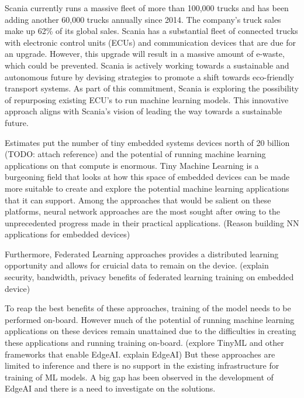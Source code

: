 Scania currently runs a massive fleet of more than 100,000 trucks and has been adding another 60,000 trucks annually since 2014. The company's truck sales make up 62\% of its global sales. Scania has a substantial fleet of connected trucks with electronic control units (ECUs) and communication devices that are due for an upgrade. However, this upgrade will result in a massive amount of e-waste, which could be prevented. Scania is actively working towards a sustainable and autonomous future by devising strategies to promote a shift towards eco-friendly transport systems.
 As part of this commitment, Scania is exploring the possibility of repurposing existing ECU's to run machine learning models. This innovative approach aligns with Scania's vision of leading the way towards a sustainable future. 




Estimates put the number of tiny embedded systems devices north of 20 billion (TODO: attach reference) and the potential of running machine learning applications on that compute is enormous. Tiny Machine Learning is a burgeoning field that looks at how this space of embedded devices can be made more suitable to create and explore the potential machine learning applications that it can support. Among the approaches that would be salient on these platforms, neural network approaches are the most sought after owing to the unprecedented progress made in their practical applications. (Reason building NN applications for embedded devices)

Furthermore, Federated Learning approaches provides a distributed learning opportunity and allows for cruicial data to remain on the device. (explain security, bandwidth, privacy benefits of federated learning training on embedded device)

To reap the best benefits of these approaches, training of the model needs to be performed on-board. However much of the potential of running machine learning applications on these devices remain unattained due to the difficulties in creating these applications and running training on-board. 
(explore TinyML and other frameworks that enable EdgeAI. explain EdgeAI)
But these approaches are limited to inference and there is no support in the existing infrastructure for training of ML models. A big gap has been observed in the development of EdgeAI and there is a need to investigate on the solutions. 

